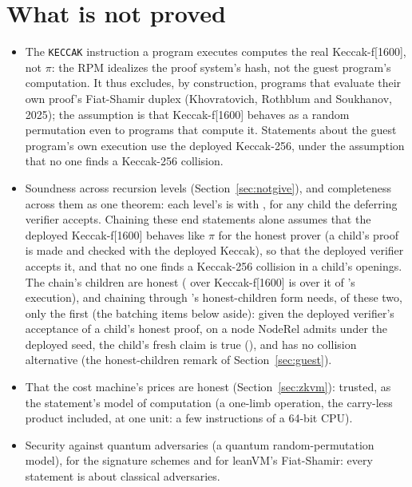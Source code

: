 \documentclass[11pt]{article}
\begin{document}
\section{What is not proved}

\begin{itemize}
\item The \texttt{KECCAK} instruction a program executes computes the real Keccak-f[1600], not
$\pi$: the RPM idealizes the proof system's hash, not the guest program's computation. It thus
excludes, by construction, programs that evaluate their own proof's Fiat-Shamir duplex
(Khovratovich, Rothblum and Soukhanov, 2025); the assumption is that Keccak-f[1600] behaves as a
random permutation even to programs that compute it. Statements
about the guest program's own execution use the deployed Keccak-256, under the assumption that no
one finds a Keccak-256 collision.
\item Soundness across recursion levels (Section~\ref{sec:notgive}), and completeness across them as one theorem: each level's is  with , for any child the deferring verifier accepts. Chaining these end statements alone assumes that the deployed Keccak-f[1600] behaves like $\pi$ for the honest prover (a child's proof is made and checked with the deployed Keccak), so that the deployed verifier accepts it, and that no one finds a Keccak-256 collision in a child's openings. The chain's children are honest ( over Keccak-f[1600] is  over it of 's execution), and chaining through 's honest-children form needs, of these two, only the first (the batching items below aside): given the deployed verifier's acceptance of a child's honest proof, on a node $\mathrm{NodeRel}$ admits under the deployed seed, the child's fresh claim is true (), and  has no collision alternative (the honest-children remark of Section~\ref{sec:guest}).
\item That the cost machine's prices are honest (Section~\ref{sec:zkvm}): trusted, as the
statement's model of computation (a one-limb operation, the carry-less product included, at one
unit: a few instructions of a 64-bit CPU).
\item Security against quantum adversaries (a quantum random-permutation model), for the
signature schemes and for leanVM's Fiat-Shamir: every statement is about classical adversaries.

\end{itemize}
\end{document}
